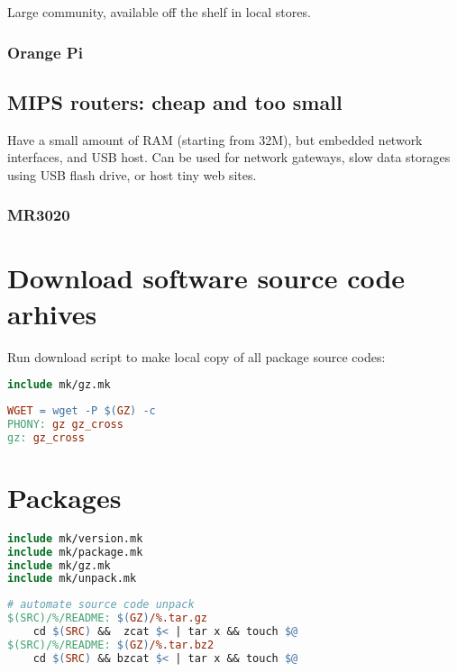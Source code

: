 Large community, available off the shelf in local stores.

\subsubsection{Orange Pi} 

\subsection{MIPS routers: cheap and too small}

Have a small amount of RAM (starting from 32M), but embedded network
interfaces, and USB host. Can be used for network gateways, slow data
storages using USB flash drive, or host tiny web sites.

\subsubsection{MR3020}

\section{Download software source code arhives}

Run download script to make local copy of all package source codes:
\begin{lstlisting}[language=make,title=Makefile]
include mk/gz.mk
\end{lstlisting}
\begin{lstlisting}[language=make,title=mk/gz]
WGET = wget -P $(GZ) -c	
PHONY: gz gz_cross
gz: gz_cross
\end{lstlisting}

\section{Packages}

\begin{lstlisting}[language=make,title=Makefile]
include mk/version.mk
include mk/package.mk
include mk/gz.mk
include mk/unpack.mk
\end{lstlisting}

\begin{lstlisting}[language=make,title=mk/unpack]
# automate source code unpack
$(SRC)/%/README: $(GZ)/%.tar.gz
	cd $(SRC) &&  zcat $< | tar x && touch $@
$(SRC)/%/README: $(GZ)/%.tar.bz2
	cd $(SRC) && bzcat $< | tar x && touch $@
\end{lstlisting}

